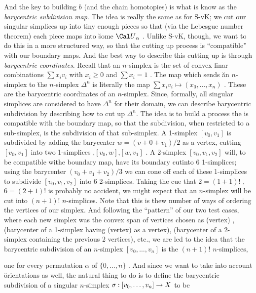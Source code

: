 And the key to building $b$ (and the chain homotopies) is what is know as the {\it barycentric subdivision map}.
The idea is really the same as for S-vK; we cut our singular simplices up into tiny enough
pieces so that (via the Lebesgue number theorem) 
each piece maps into \u{some} ${\Cal U}_\alpha$ . Unlike S-vK, though, we want to do 
this in a more structured way, so that the cutting up process is ``compatible'' with our
boundary maps. And the best way to describe this cutting up is through {\it barycentric
coordinates}. Recall that an $n$-simplex is the set of convex linar combinations
$\sum x_i v_i$ with $x_i\geq 0$ and $\sum x_i=1$ . The map which sends \u{an}
$n$-simplex to \u{the} $n$-simplex $\Delta^n$ is literally the map 
$\sum x_i v_i \mapsto (x_0,\ldots ,x_n)$ . These are the barycentric coordinates of an $n$-simplex.
Since, formally, all singular simplices are considered to have $\Delta^n$ for their
domain, we can describe barycentric subdivision by describing how to cut up $\Delta^n$.
The idea is to build a process the is compatible with the boundary map, so that the
subdivision, when restricted to a sub-simplex, is the subdivision of that sub-simplex.
A 1-simplex $[v_0,v_1]$ is subdivided by adding the barycenter $w=(v+0+v_1)/2$ as a vertex,
cutting $[v_0,v_1]$ into two 1-simplices ,$[v_0,w]$,$[w,v_1]$ . A 2-simplex 
$[v_0,v_1,v_2]$ will, to be compatible withe boundary map,
have its boundary cutinto 6 1-simplices; using the barycenter $(v_0+v_1+v_2)/3$
we can cone off each of these 1-simplices to subdivide $[v_0,v_1,v_2]$
into 6 2-simplices. Taking the cue that $2=(1+1)!$ , $6=(2+1)!$ is probably no accident, we
might expect that an $n$-simplex will be cut into $(n+1)!$ $n$-simplices. 
Note that this is thew number of ways of ordering the vertices of our simplex. 
And following the ``pattern'' of our two test cases, where each new simplex was the convex
span of vertices chosen as (vertex) , (barycenter of a 1-simplex having (vertex) as a vertex),
(barycenter of a 2-simplex containing the previous 2 vertices), etc., we are led to the idea that
the barycentric subdivision of an $n$-simplex $[v_0,\ldots , v_n]$ is the 
$(n+1)!$ $n$-simplices, 


one for every permutation $\alpha$ of $\{0,\ldots ,n\}$ . And since we want to take into account
\u{orientations} as well, the natural thing to do is to define the barycentric subdivision of a singular
$n$-simplex $\sigma:[v_0,\ldots ,v_n]\rightarrow X$ to be

